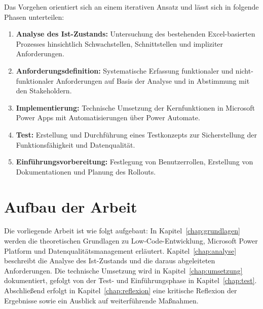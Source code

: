 Das Vorgehen orientiert sich an einem iterativen Ansatz und lässt 
sich in folgende Phasen unterteilen:

\begin{enumerate}
    \item \textbf{Analyse des Ist-Zustands:} Untersuchung des 
    bestehenden Excel-basierten Prozesses hinsichtlich Schwachstellen, 
    Schnittstellen und impliziter Anforderungen.
    \item \textbf{Anforderungsdefinition:} Systematische Erfassung 
    funktionaler und nicht-funktionaler Anforderungen auf Basis der 
    Analyse und in Abstimmung mit den Stakeholdern.
    \item \textbf{Implementierung:} Technische Umsetzung der 
    Kernfunktionen in Microsoft Power Apps mit Automatisierungen 
    über Power Automate.
    \item \textbf{Test:} Erstellung und Durchführung eines 
    Testkonzepts zur Sicherstellung der Funktionsfähigkeit und 
    Datenqualität.
    \item \textbf{Einführungsvorbereitung:} Festlegung von 
    Benutzerrollen, Erstellung von Dokumentationen und Planung des 
    Rollouts.
\end{enumerate}

\section{Aufbau der Arbeit}
\label{sec:aufbau}

Die vorliegende Arbeit ist wie folgt aufgebaut: In 
Kapitel~\ref{chap:grundlagen} werden die theoretischen Grundlagen 
zu Low-Code-Entwicklung, Microsoft Power Platform und 
Datenqualitätsmanagement erläutert. 
Kapitel~\ref{chap:analyse} beschreibt die Analyse des Ist-Zustands 
und die daraus abgeleiteten Anforderungen. Die technische Umsetzung 
wird in Kapitel~\ref{chap:umsetzung} dokumentiert, gefolgt von der 
Test- und Einführungsphase in Kapitel~\ref{chap:test}. 
Abschließend erfolgt in Kapitel~\ref{chap:reflexion} eine kritische 
Reflexion der Ergebnisse sowie ein Ausblick auf weiterführende 
Maßnahmen.
